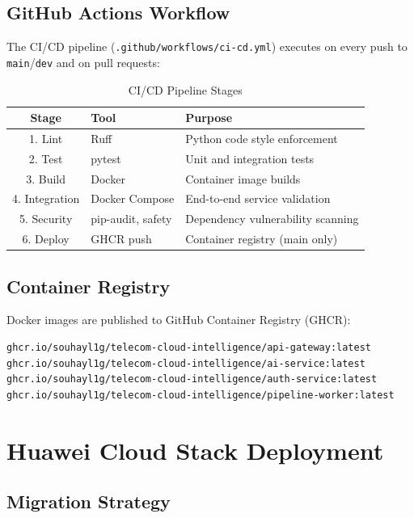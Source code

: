 \subsection{GitHub Actions Workflow}

The CI/CD pipeline (\texttt{.github/workflows/ci-cd.yml}) executes on every push to \texttt{main}/\texttt{dev} and on pull requests:

\begin{table}[H]
\centering
\caption{CI/CD Pipeline Stages}
\label{tab:cicd-stages}
\begin{tabular}{@{}cll@{}}
\toprule
\textbf{Stage} & \textbf{Tool} & \textbf{Purpose} \\
\midrule
1. Lint & Ruff & Python code style enforcement \\
2. Test & pytest & Unit and integration tests \\
3. Build & Docker & Container image builds \\
4. Integration & Docker Compose & End-to-end service validation \\
5. Security & pip-audit, safety & Dependency vulnerability scanning \\
6. Deploy & GHCR push & Container registry (main only) \\
\bottomrule
\end{tabular}
\end{table}

\subsection{Container Registry}

Docker images are published to GitHub Container Registry (GHCR):

\begin{lstlisting}[language=bash]
ghcr.io/souhayl1g/telecom-cloud-intelligence/api-gateway:latest
ghcr.io/souhayl1g/telecom-cloud-intelligence/ai-service:latest
ghcr.io/souhayl1g/telecom-cloud-intelligence/auth-service:latest
ghcr.io/souhayl1g/telecom-cloud-intelligence/pipeline-worker:latest
\end{lstlisting}

\section{Huawei Cloud Stack Deployment}

\subsection{Migration Strategy}

